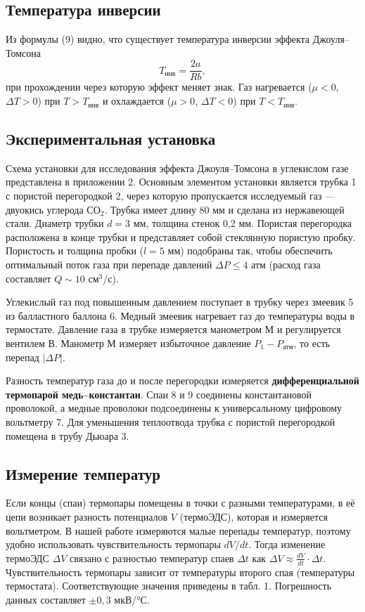 \documentclass[a4paper]{article}
\begin{document}
	\subsection*{Температура инверсии}
	Из формулы (9) видно, что существует температура инверсии эффекта Джоуля--Томсона
	\begin{equation}
		T_{\text{инв}} = \frac{2a}{Rb},
	\end{equation}
	при прохождении через которую эффект меняет знак. Газ нагревается ($\mu < 0$, $\Delta T > 0$) при $T > T_{\text{инв}}$ и охлаждается ($\mu > 0$, $\Delta T < 0$) при $T < T_{\text{инв}}$.
	
	\subsection{Экспериментальная установка}
	
	Схема установки для исследования эффекта Джоуля--Томсона в углекислом газе представлена в приложении 2. Основным элементом установки является трубка 1 с пористой перегородкой 2, через которую пропускается исследуемый газ --- двуокись углерода СО$_2$. Трубка имеет длину 80 мм и сделана из нержавеющей стали. Диаметр трубки $d = 3$ мм, толщина стенок 0,2 мм. Пористая перегородка расположена в конце трубки и представляет собой стеклянную пористую пробку. Пористость и толщина пробки ($l = 5$ мм) подобраны так, чтобы обеспечить оптимальный поток газа при перепаде давлений $\Delta P \leq 4$ атм (расход газа составляет $Q \sim 10$ см$^3$/с).
	
	
	Углекислый газ под повышенным давлением поступает в трубку через змеевик 5 из балластного баллона 6. Медный змеевик нагревает газ до температуры воды в термостате. Давление газа в трубке измеряется манометром М и регулируется вентилем В. Манометр М измеряет избыточное давление $P_1 - P_{\text{атм}}$, то есть перепад $|\Delta P|$.
	
	Разность температур газа до и после перегородки измеряется \textbf{дифференциальной термопарой медь–константан}. Спаи 8 и 9 соединены константановой проволокой, а медные проволоки подсоединены к универсальному цифровому вольтметру 7. Для уменьшения теплоотвода трубка с пористой перегородкой помещена в трубу Дьюара 3.
	
	\subsection*{Измерение температур}
	Если концы (спаи) термопары помещены в точки с разными температурами, в её цепи возникает разность потенциалов $V$ (термоЭДС), которая и измеряется вольтметром. В нашей работе измеряются малые перепады температур, поэтому удобно использовать чувствительность термопары $dV/dt$. Тогда изменение термоЭДС $\Delta V$ связано с разностью температур спаев $\Delta t$ как $\Delta V \approx \frac{dV}{dt} \cdot \Delta t$. Чувствительность термопары зависит от температуры второго спая (температуры термостата). Соответствующие значения приведены в табл. 1. Погрешность данных составляет $\pm 0,3$ мкВ/°С.
	
\end{document}

